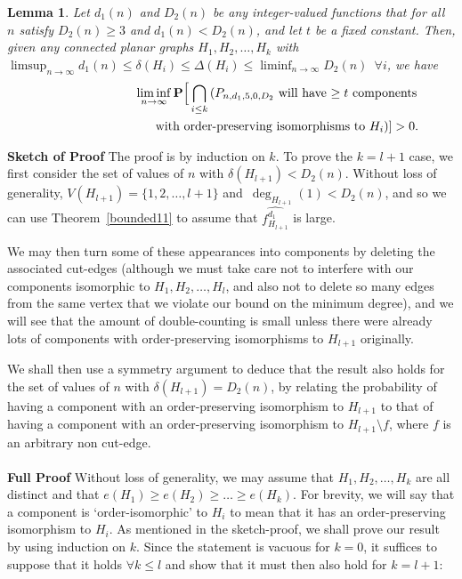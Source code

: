 \documentclass{article}
\newtheorem{Lemma}[Theorem]{Lemma}
\newtheorem{Proof of Theorem}{Proof of Theorem}
\begin{document}
\begin{Lemma} \label{bounded7}
Let $d_{1}(n)$ and $D_{2}(n)$ be any integer-valued functions 
that for all $n$ satisfy $D_{2}(n) \geq 3$ and $d_{1}(n)<D_{2}(n)$,
and let $t$ be a fixed constant.
Then, given any connected planar graphs $H_{1},H_{2}, \ldots, H_{k}$ with 
$\limsup_{n \to \infty}d_{1}(n) \leq \delta(H_{i}) \leq \Delta(H_{i}) \leq \liminf_{n \to \infty}D_{2}(n)$~$\forall i$,
we have
\begin{eqnarray*}
& & \liminf_{n \to \infty}
\mathbf{P}
\Big[\bigcap_{i \leq k} \left(\textrm{$P_{n,d_{1},5,0,D_{2}}$ 
will have $\geq t$ components}\right. \\
& & \textrm{\phantom{wwwwwwwwwww}with order-preserving isomorphisms to $H_{i}$} ) ] 
> 0.
\end{eqnarray*}
\end{Lemma}
\textbf{Sketch of Proof} 
The proof is by induction on $k$.
To prove the $k=l+1$ case,
we first consider the set of values of $n$ with $\delta (H_{l+1}) < D_{2}(n)$.
Without loss of generality,
$V(H_{l+1})= \{ 1,2, \ldots, l+1 \}$ and~$\deg_{H_{l+1}}(1)<D_{2}(n)$,
and so we can use Theorem~\ref{bounded11} to assume that $\widehat{f_{H_{l+1}}^{d_{1}}}$ is large.

We may then turn some of these appearances into components 
by deleting the associated cut-edges
(although we must take care not to interfere with our components isomorphic to 
$H_{1},H_{2}, \ldots, H_{l}$,
and also not to delete so many edges from the same vertex that we violate our bound on the minimum degree),
and we will see that the amount of double-counting is small 
unless there were already lots of components with order-preserving isomorphisms to $H_{l+1}$
originally. 

We shall then use a symmetry argument to deduce that the result also holds 
for the set of values of $n$ with $\delta(H_{l+1}) = D_{2}(n)$,
by relating the probability of having a component with an order-preserving isomorphism to $H_{l+1}$ 
to that of having a component with an order-preserving isomorphism to $H_{l+1} \setminus f$,
where $f$ is an arbitrary non cut-edge. \\
\\
\textbf{Full Proof}
Without loss of generality,
we may assume that $H_{1},H_{2}, \ldots, H_{k}$
are all distinct and that 
$e(H_{1}) \geq e(H_{2}) \geq \ldots \geq e(H_{k})$.
For brevity,
we will say that a component is `order-isomorphic' to $H_{i}$
to mean that it has an order-preserving isomorphism to $H_{i}$.
As mentioned in the sketch-proof,
we shall prove our result by using induction on $k$.
Since the statement is vacuous for $k=0$,
it suffices to suppose that it holds $\forall k \leq l$
and show that it must then also hold for $k=l+1$: \\
\end{document}
